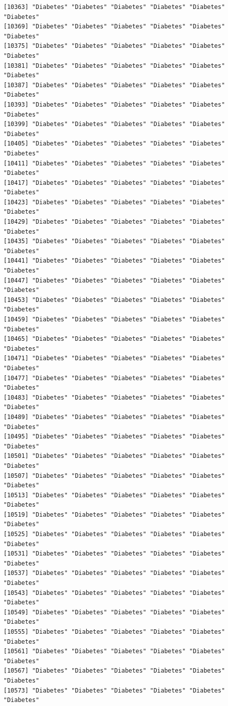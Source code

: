\documentclass[
  letterpaper,
  DIV=11,
  numbers=noendperiod]{scrartcl}
\begin{document}
\begin{verbatim}
[10363] "Diabetes" "Diabetes" "Diabetes" "Diabetes" "Diabetes" "Diabetes"
[10369] "Diabetes" "Diabetes" "Diabetes" "Diabetes" "Diabetes" "Diabetes"
[10375] "Diabetes" "Diabetes" "Diabetes" "Diabetes" "Diabetes" "Diabetes"
[10381] "Diabetes" "Diabetes" "Diabetes" "Diabetes" "Diabetes" "Diabetes"
[10387] "Diabetes" "Diabetes" "Diabetes" "Diabetes" "Diabetes" "Diabetes"
[10393] "Diabetes" "Diabetes" "Diabetes" "Diabetes" "Diabetes" "Diabetes"
[10399] "Diabetes" "Diabetes" "Diabetes" "Diabetes" "Diabetes" "Diabetes"
[10405] "Diabetes" "Diabetes" "Diabetes" "Diabetes" "Diabetes" "Diabetes"
[10411] "Diabetes" "Diabetes" "Diabetes" "Diabetes" "Diabetes" "Diabetes"
[10417] "Diabetes" "Diabetes" "Diabetes" "Diabetes" "Diabetes" "Diabetes"
[10423] "Diabetes" "Diabetes" "Diabetes" "Diabetes" "Diabetes" "Diabetes"
[10429] "Diabetes" "Diabetes" "Diabetes" "Diabetes" "Diabetes" "Diabetes"
[10435] "Diabetes" "Diabetes" "Diabetes" "Diabetes" "Diabetes" "Diabetes"
[10441] "Diabetes" "Diabetes" "Diabetes" "Diabetes" "Diabetes" "Diabetes"
[10447] "Diabetes" "Diabetes" "Diabetes" "Diabetes" "Diabetes" "Diabetes"
[10453] "Diabetes" "Diabetes" "Diabetes" "Diabetes" "Diabetes" "Diabetes"
[10459] "Diabetes" "Diabetes" "Diabetes" "Diabetes" "Diabetes" "Diabetes"
[10465] "Diabetes" "Diabetes" "Diabetes" "Diabetes" "Diabetes" "Diabetes"
[10471] "Diabetes" "Diabetes" "Diabetes" "Diabetes" "Diabetes" "Diabetes"
[10477] "Diabetes" "Diabetes" "Diabetes" "Diabetes" "Diabetes" "Diabetes"
[10483] "Diabetes" "Diabetes" "Diabetes" "Diabetes" "Diabetes" "Diabetes"
[10489] "Diabetes" "Diabetes" "Diabetes" "Diabetes" "Diabetes" "Diabetes"
[10495] "Diabetes" "Diabetes" "Diabetes" "Diabetes" "Diabetes" "Diabetes"
[10501] "Diabetes" "Diabetes" "Diabetes" "Diabetes" "Diabetes" "Diabetes"
[10507] "Diabetes" "Diabetes" "Diabetes" "Diabetes" "Diabetes" "Diabetes"
[10513] "Diabetes" "Diabetes" "Diabetes" "Diabetes" "Diabetes" "Diabetes"
[10519] "Diabetes" "Diabetes" "Diabetes" "Diabetes" "Diabetes" "Diabetes"
[10525] "Diabetes" "Diabetes" "Diabetes" "Diabetes" "Diabetes" "Diabetes"
[10531] "Diabetes" "Diabetes" "Diabetes" "Diabetes" "Diabetes" "Diabetes"
[10537] "Diabetes" "Diabetes" "Diabetes" "Diabetes" "Diabetes" "Diabetes"
[10543] "Diabetes" "Diabetes" "Diabetes" "Diabetes" "Diabetes" "Diabetes"
[10549] "Diabetes" "Diabetes" "Diabetes" "Diabetes" "Diabetes" "Diabetes"
[10555] "Diabetes" "Diabetes" "Diabetes" "Diabetes" "Diabetes" "Diabetes"
[10561] "Diabetes" "Diabetes" "Diabetes" "Diabetes" "Diabetes" "Diabetes"
[10567] "Diabetes" "Diabetes" "Diabetes" "Diabetes" "Diabetes" "Diabetes"
[10573] "Diabetes" "Diabetes" "Diabetes" "Diabetes" "Diabetes" "Diabetes"

\end{verbatim}
\end{document}
